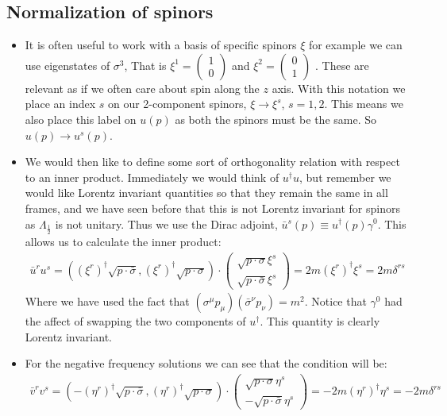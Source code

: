 \documentclass[11pt]{article}
\numberwithin{equation}{section}
\begin{document}
\subsection{Normalization of spinors}
\begin{itemize}
  \item It is often useful to work with a basis of specific spinors $\xi$ for example we can use eigenstates of $\sigma^{3}$, That is $\xi^{1} = \begin{pmatrix}
    1 \\
    0
  \end{pmatrix}$ and $\xi^{2} = \begin{pmatrix}
    0 \\
    1
  \end{pmatrix}$ . These are relevant as if we often care about spin along the $z$ axis. With this notation we place an index $s$ on our 2-component spinors, $\xi \rightarrow \xi^{s}$, $s=1,2$. This means we also place this label on $u(p)$ as both the spinors must be the same. So $u(p)\rightarrow u^{s}(p)$. 

  \item We would then like to define some sort of orthogonality relation with respect to an inner product. Immediately we would think of $u^{\dagger}u$, but remember we would like Lorentz invariant quantities so that they remain the same in all frames, and we have seen before that this is not Lorentz invariant for spinors as $\Lambda_{\frac{1}{2}}$ is not unitary. Thus we use the Dirac adjoint, $\bar{u}^s(p) \equiv u^{\dagger}(p)\gamma^{0}$. This allows us to calculate the inner product:
  \begin{align}
      \bar{u}^{r}u^{s} = ((\xi^{r})^{\dagger}\sqrt{p \cdot \bar{\sigma}},(\xi^r)^{\dagger}\sqrt{p \cdot \sigma}) \cdot \begin{pmatrix}
       \sqrt{p \cdot \sigma}\xi^s \\
        \sqrt{p \cdot \bar{\sigma}}\xi^s 
       \end{pmatrix} = 2m(\xi^r)^{\dagger}\xi^s = 2m\delta^{rs}
    \end{align}  
    Where we have used the fact that $(\sigma^{\mu}p_{\mu})(\bar{\sigma}^{\nu}p_{\nu}) =m^2$. Notice that $\gamma^{0}$ had the affect of swapping the two components of $u^{\dagger}$. This quantity is clearly Lorentz invariant.

    \item For the negative frequency solutions we can see that the condition will be:
    \begin{align}
      \bar{v}^{r}v^{s} = (-(\eta^{r})^{\dagger}\sqrt{p \cdot \bar{\sigma}},(\eta^r)^{\dagger}\sqrt{p \cdot \sigma}) \cdot \begin{pmatrix}
       \sqrt{p \cdot \sigma}\eta^s \\
        -\sqrt{p \cdot \bar{\sigma}}\eta^s 
       \end{pmatrix} = -2m(\eta^r)^{\dagger}\eta^s = -2m\delta^{rs}
    \end{align}
    

\end{itemize}
\end{document}
